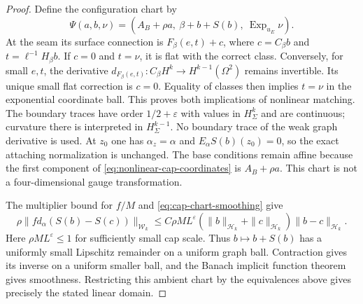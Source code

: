 \documentclass[11pt]{amsart}
\theoremstyle{definition}
\theoremstyle{remark}
\theoremstyle{plain}
\begin{document}
\begin{proof}
Define the configuration chart by
\begin{equation}\label{eq:nonlinear-cap-coordinates}
 \Psi(a,b,\nu)=
 (A_B+\rho a,\ \beta+b+S(b),\ \operatorname{Exp}_{u_E}\nu).
\end{equation}
At the seam its surface connection is $F_\beta(e,t)+c$,
where $c=C_\beta b$ and $t=\ell^{-1}H_\beta b$.
If $c=0$ and $t=\nu$, it is flat with the correct class.
Conversely, for small $e,t$, the derivative
$d_{F_\beta(e,t)}:C_\beta H^k\to H^{k-1}(\Omega^2)$
remains invertible. Its unique small flat correction is $c=0$.
Equality of classes then implies $t=\nu$ in the exponential
coordinate ball. This proves both implications of nonlinear
matching. The boundary traces have order $1/2+\varepsilon$
with values in $H_\Sigma^k$ and are continuous; curvature
there is interpreted in $H_\Sigma^{k-1}$. No boundary trace
of the weak graph derivative is used.
At $z_0$ one has $\alpha_z=\alpha$ and $E_\alpha S(b)(z_0)=0$,
so the exact attaching normalization is unchanged. The base
conditions remain affine because the first component of
\eqref{eq:nonlinear-cap-coordinates} is $A_B+\rho a$.
This chart is not a four-dimensional gauge transformation.

The multiplier bound for $f/M$ and
\eqref{eq:cap-chart-smoothing} give
\begin{equation}\label{eq:cap-chart-graph-bound}
 \rho\|f d_\alpha(S(b)-S(c))\|_{\mathcal W_k}
 \leq C\rho ML^\varepsilon
       (\|b\|_{\mathcal H_k}+\|c\|_{\mathcal H_k})
                              \|b-c\|_{\mathcal H_k}.
\end{equation}
Here $\rho ML^\varepsilon\leq1$ for sufficiently small cap
scale. Thus $b\mapsto b+S(b)$ has a uniformly small Lipschitz
remainder on a uniform graph ball. Contraction gives its inverse
on a uniform smaller ball, and the Banach implicit function
theorem gives smoothness. Restricting this ambient chart by
the equivalences above gives precisely the stated linear domain.


\end{proof}
\end{document}
